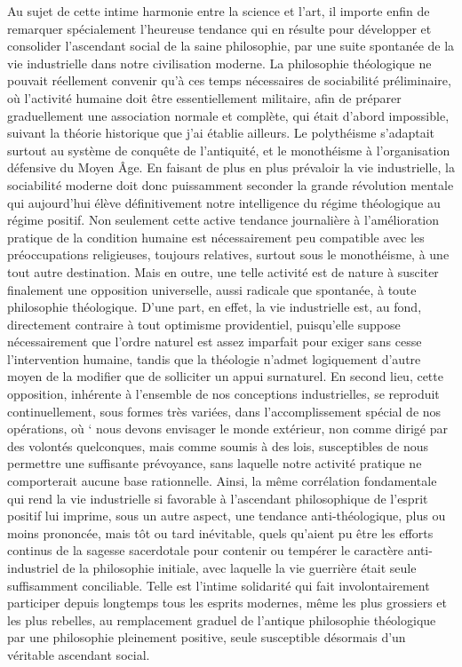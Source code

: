 \documentclass[french,twoside]{book} %
\begin{document}
Au sujet de cette intime harmonie entre la science et l’art, il importe enfin de remarquer spécialement l’heureuse tendance qui en résulte pour développer et consolider l’ascendant social de la saine philosophie, par une suite spontanée de la vie industrielle dans notre civilisation moderne. La philosophie théologique ne pouvait réellement convenir qu’à ces temps nécessaires de sociabilité préliminaire, où l’activité humaine doit être essentiellement militaire, afin de préparer graduellement une association normale et complète, qui était d’abord impossible, suivant la théorie historique que j’ai établie ailleurs. Le polythéisme s’adaptait surtout au système de conquête de l’antiquité, et le monothéisme à l’organisation défensive du Moyen Âge. En faisant de plus en plus prévaloir la vie industrielle, la sociabilité moderne doit donc puissamment seconder la grande révolution mentale qui aujourd’hui élève définitivement notre intelligence du régime théologique au régime positif. Non seulement cette active tendance journalière à l’amélioration pratique de la condition humaine est nécessairement peu compatible avec les préoccupations religieuses, toujours relatives, surtout sous le monothéisme, à une tout autre destination. Mais en outre, une telle activité est de nature à susciter finalement une opposition universelle, aussi radicale que spontanée, à toute philosophie théologique. D’une part, en effet, la vie industrielle est, au fond, directement contraire à tout optimisme providentiel, puisqu’elle suppose nécessairement que l’ordre naturel est assez imparfait pour exiger sans cesse l’intervention humaine, tandis que la théologie n’admet logiquement d’autre moyen de la modifier que de solliciter un appui surnaturel. En second lieu, cette opposition, inhérente à l’ensemble de nos conceptions industrielles, se reproduit continuellement, sous formes très variées, dans l’accomplissement spécial de nos opérations, où ‘ nous devons envisager le monde extérieur, non comme dirigé par des volontés quelconques, mais comme soumis à des lois, susceptibles de nous permettre une suffisante prévoyance, sans laquelle notre activité pratique ne comporterait aucune base rationnelle. Ainsi, la même corrélation fondamentale qui rend la vie industrielle si favorable à l’ascendant philosophique de l’esprit positif lui imprime, sous un autre aspect, une tendance anti-théologique, plus ou moins prononcée, mais tôt ou tard inévitable, quels qu’aient pu être les efforts continus de la sagesse sacerdotale pour contenir ou tempérer le caractère anti-industriel de la philosophie initiale, avec laquelle la vie guerrière était seule suffisamment conciliable. Telle est l’intime solidarité qui fait involontairement participer depuis longtemps tous les esprits modernes, même les plus grossiers et les plus rebelles, au remplacement graduel de l’antique philosophie théologique par une philosophie pleinement positive, seule susceptible désormais d’un véritable ascendant social.\par
\end{document}
